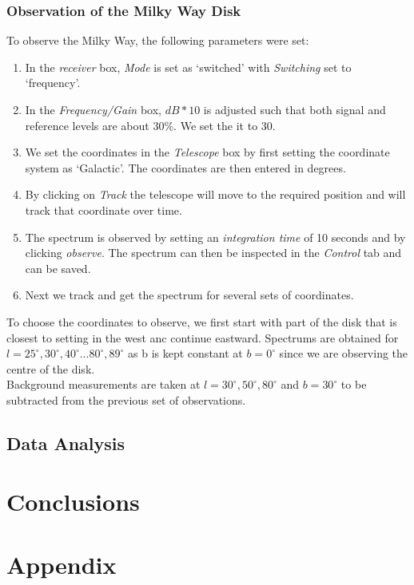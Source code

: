 \documentclass[12pt,a4paper]{article}
\begin{document}
        \subsubsection{Observation of the Milky Way Disk}
            To observe the Milky Way, the following parameters were set:
            \begin{enumerate}
                \item In the \textit{receiver} box, \textit{Mode} is set as `switched' with \textit{Switching} set to `frequency'.
                \item In the \textit{Frequency/Gain} box, $dB*10$ is adjusted such that both signal and reference levels are about $30\%$. We set the it to 30.
                \item We set the coordinates in the \textit{Telescope} box by first setting the coordinate system as `Galactic'. The coordinates are then entered in degrees.
                \item By clicking on \textit{Track} the telescope will move to the required position and will track that coordinate over time.
                \item The spectrum is observed by setting an \textit{integration time} of 10 seconds and by clicking \textit{observe}. The spectrum can then be inspected in the \textit{Control} tab and can be saved.
                \item Next we track and get the spectrum for several sets of coordinates. 
            \end{enumerate}
            
            To choose the coordinates to observe, we first start with part of the disk that is closest to setting in the west anc continue eastward. Spectrums are obtained for $l=25^\circ,30^\circ,40^\circ \dots 80^\circ, 89^\circ$ as b is kept constant at $b=0^\circ$ since we are observing the centre of the disk. \\

            Background measurements are taken at $l=30^\circ,50^\circ,80^\circ$ and $b=30^\circ$ to be subtracted from the previous set of observations.

    \subsection{Data Analysis}

\section{Conclusions}

\printbibliography     
\appendix
\section{Appendix}
\end{document}
